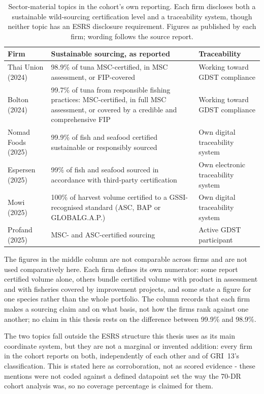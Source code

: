 \begin{table}[H]
\centering
\caption{Sector-material topics in the cohort's own reporting. Each firm
discloses both a sustainable wild-sourcing certification level and a
traceability system, though neither topic has an ESRS disclosure requirement.
Figures as published by each firm; wording follows the source report.}
\label{tab:sector-material-evidence}
\footnotesize
\begin{tabularx}{\textwidth}{@{} l X p{4.5cm} @{}}
\toprule
\textbf{Firm} & \textbf{Sustainable sourcing, as reported} & \textbf{Traceability} \\
\midrule
Thai Union (2024) & 98.9\% of tuna MSC-certified, in MSC assessment, or FIP-covered & Working toward GDST compliance \\
Bolton (2024) & 99.7\% of tuna from responsible fishing practices: MSC-certified, in full MSC assessment, or covered by a credible and comprehensive FIP & Working toward GDST compliance \\
Nomad Foods (2025) & 99.9\% of fish and seafood certified sustainable or responsibly sourced & Own digital traceability system \\
Espersen (2025) & 99\% of fish and seafood sourced in accordance with third-party certification & Own electronic traceability system \\
Mowi (2025) & 100\% of harvest volume certified to a GSSI-recognised standard (ASC, BAP or GLOBALG.A.P.) & Own digital traceability system \\
Profand (2025) & MSC- and ASC-certified sourcing & Active GDST participant \\
\bottomrule
\end{tabularx}
\end{table}
The figures in the middle column are not comparable across firms and are not
used comparatively here. Each firm defines its own numerator: some report
certified volume alone, others bundle certified volume with product in
assessment and with fisheries covered by improvement projects, and some state a
figure for one species rather than the whole portfolio. The column records that
each firm makes a sourcing claim and on what basis, not how the firms rank
against one another; no claim in this thesis rests on the difference between
99.9\% and 98.9\%.

The two topics fall outside the ESRS structure this thesis uses as its main
coordinate system, but they are not a marginal or invented addition: every
firm in the cohort reports on both, independently of each other and of GRI~13's
classification. This is stated here as corroboration, not as scored
evidence - these mentions were not coded against a defined datapoint set
the way the 70-DR cohort analysis was, so no coverage percentage is claimed
for them.

